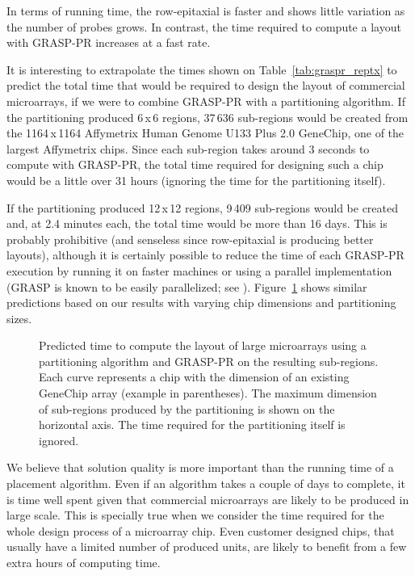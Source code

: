 \documentclass{bioinfo}
\begin{document}
In terms of running time, the row-epitaxial is faster and shows little variation as the number of probes grows. In contrast, the time required to compute a layout with GRASP-PR increases at a fast rate.

It is interesting to extrapolate the times shown on Table~\ref{tab:graspr_reptx} to predict the total time that would be required to design the layout of commercial microarrays, if we were to combine GRASP-PR with a partitioning algorithm. If the partitioning produced 6\,x\,6 regions, 37\,636 sub-regions would be created from the 1164\,x\,1164 Affymetrix Human Genome U133 Plus 2.0 GeneChip\raisebox{.6ex}{\scriptsize \textregistered}, one of the largest Affymetrix chips. Since each sub-region takes around 3 seconds to compute with GRASP-PR, the total time required for designing such a chip would be a little over 31 hours (ignoring the time for the partitioning itself).

If the partitioning produced 12\,x\,12 regions, 9\,409 sub-regions would be created and, at 2.4 minutes each, the total time would be more than 16 days. This is probably prohibitive (and senseless since row-epitaxial is producing better layouts), although it is certainly possible to reduce the time of each GRASP-PR execution by running it on faster machines or using a parallel implementation (GRASP is known to be easily parallelized; see \citealp{LI94}). Figure~\ref{fig:time_extrapolation} shows similar predictions based on our results with varying chip dimensions and partitioning sizes.

\begin{figure}
\caption{Predicted time to compute the layout of large microarrays using a partitioning algorithm and GRASP-PR on the resulting sub-regions. Each curve represents a chip with the dimension of an existing GeneChip array (example in parentheses). The maximum dimension of sub-regions produced by the partitioning is shown on the horizontal axis. The time required for the partitioning itself is ignored.}\label{fig:time_extrapolation}
\end{figure}

We believe that solution quality is more important than the running time of a placement algorithm. Even if an algorithm takes a couple of days to complete, it is time well spent given that commercial microarrays are likely to be produced in large scale. This is specially true when we consider the time required for the whole design process of a microarray chip. Even customer designed chips, that usually have a limited number of produced units, are likely to benefit from a few extra hours of computing time.
\end{document}
